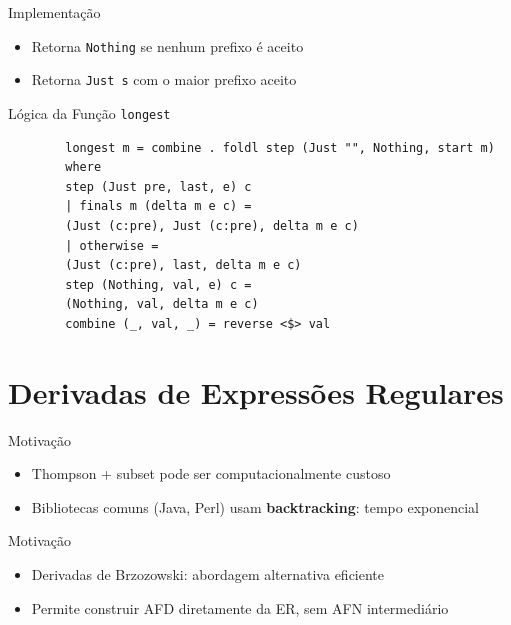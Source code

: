 \begin{frame}[fragile]{Implementação}

    \begin{itemize}

        \item
        Retorna \texttt{Nothing} se nenhum prefixo é aceito
        \item
        Retorna \texttt{Just s} com o maior prefixo aceito
    \end{itemize}
\end{frame}

\begin{frame}[fragile]{Lógica da Função
    \texttt{longest}}

    \begin{lstlisting}
        longest m = combine . foldl step (Just "", Nothing, start m)
        where
        step (Just pre, last, e) c
        | finals m (delta m e c) =
        (Just (c:pre), Just (c:pre), delta m e c)
        | otherwise =
        (Just (c:pre), last, delta m e c)
        step (Nothing, val, e) c =
        (Nothing, val, delta m e c)
        combine (_, val, _) = reverse <$> val
    \end{lstlisting}
\end{frame}


\section{Derivadas de Expressões
Regulares}\label{derivadas-de-expressuxf5es-regulares}

\begin{frame}{Motivação}

    \begin{itemize}

        \item
        Thompson + subset pode ser computacionalmente custoso
        \item
        Bibliotecas comuns (Java, Perl) usam \textbf{backtracking}: tempo
        exponencial
    \end{itemize}
\end{frame}

\begin{frame}{Motivação}

    \begin{itemize}

        \item
        Derivadas de Brzozowski: abordagem alternativa eficiente
        \item
        Permite construir AFD diretamente da ER, sem AFN intermediário
    \end{itemize}
\end{frame}

